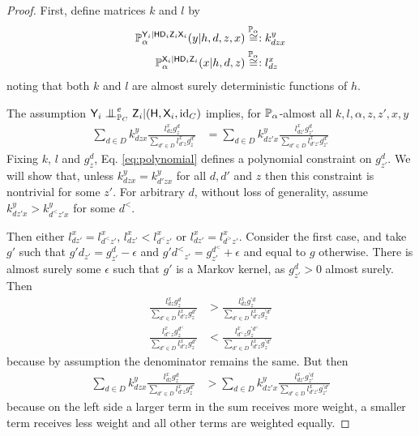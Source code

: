 \begin{proof}
First, define matrices $k$ and $l$ by
\begin{align}
    \mathbb{P}_\alpha^{\mathsf{Y}_i|\mathsf{H}\mathsf{D}_i\mathsf{Z}_i\mathsf{X}_i}(y|h,d,z,x)&\overset{\mathbb{P}_\alpha}{\cong}: k^y_{dzx}\\
    \mathbb{P}_\alpha^{\mathsf{X}_i|\mathsf{H}\mathsf{D}_i\mathsf{Z}_i}(x|h,d,z)&\overset{\mathbb{P}_\alpha}{\cong}: l^x_{dz}
\end{align}
noting that both $k$ and $l$ are almost surely deterministic functions of $h$.

The assumption $\RV{Y}_i\CI^e_{\prob{P}_C} \RV{Z}_i|(\RV{H},\RV{X}_i,\text{id}_C)$ implies, for $\mathbb{P}_\alpha$-almost all $k,l,\alpha,z,z',x,y$
\begin{align}
    \sum_{d\in D} k^y_{dzx}\frac{l^x_{dz}g^d_z}{\sum_{d'\in D}l^x_{d'z}g^{d'}_z}&= \sum_{d\in D} k^y_{dz'x}\frac{l^x_{dz'}g^d_{z'}}{\sum_{d'\in D}l^x_{d'z'}g^{d'}_{z'}}\label{eq:polynomial}
\end{align}
Fixing $k$, $l$ and $g^d_z$, Eq. \eqref{eq:polynomial} defines a polynomial constraint on $g^d_{z'}$. We will show that, unless $k^y_{dzx}=k^y_{d'zx}$ for all $d,d'$ and $z$ then this constraint is nontrivial for some $z'$. For arbitrary $d$, without loss of generality, assume $k^y_{dz'x} > k^y_{d^<z'x}$ for some $d^<$. 

Then either $l^x_{dz'}=l^x_{d^<z'}$, $l^x_{dz'}< l^x_{d^<z'}$ or $l^x_{dz'}=l^x_{d^>z'}$. Consider the first case, and take $g'$ such that $g{\prime d}_{z'}=g^{d}_{z'}-\epsilon$ and $g{\prime d^<}_{z'}=g^{d^<}_{z'}+\epsilon$ and equal to $g$ otherwise. There is almost surely some $\epsilon$ such that $g'$ is a Markov kernel, as $g^{d}_{z'}>0$ almost surely. Then
\begin{align}
    \frac{l^x_{dz}g^d_z}{\sum_{d'\in D}l^x_{d'z}g^{d'}_z} &> \frac{l^x_{dz}g^{\prime d}_z}{\sum_{d'\in D}l^x_{d'z}g^{\prime d'}_z}\\
    \frac{l^x_{d^<z}g^{d^<}_z}{\sum_{d'\in D}l^x_{d'z}g^{d'}_z} &< \frac{l^x_{d^<z}g^{\prime d^<}_z}{\sum_{d'\in D}l^x_{d'z}g^{\prime d'}_z}
\end{align}
because by assumption the denominator remains the same. But then
\begin{align}
    \sum_{d\in D} k^y_{dzx}\frac{l^x_{dz}g^d_z}{\sum_{d'\in D}l^x_{d'z}g^{d'}_z}&> \sum_{d\in D} k^y_{dz'x}\frac{l^x_{dz'}g^{\prime d}_{z'}}{\sum_{d'\in D}l^x_{d'z'}g^{\prime d'}_{z'}}\label{eq:inequality}
\end{align}
because on the left side a larger term in the sum receives more weight, a smaller term receives less weight and all other terms are weighted equally.


\end{proof}
